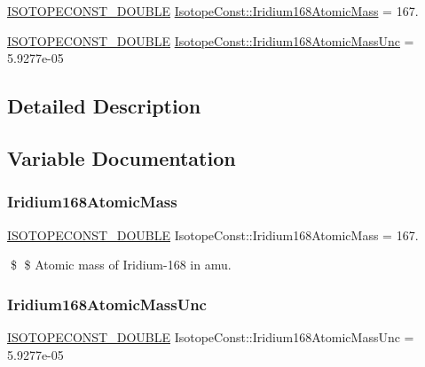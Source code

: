 \begin{DoxyCompactItemize}
\item 
\mbox{\hyperlink{group___isotope_const-_macros_ga8f45a7272ce02c0b4c65c44636ed719a}{I\+S\+O\+T\+O\+P\+E\+C\+O\+N\+S\+T\+\_\+\+D\+O\+U\+B\+LE}} \mbox{\hyperlink{group___isotope_const-_iridium-_ir168_gaa4c59a5023aafee19a18a7afe0813a67}{Isotope\+Const\+::\+Iridium168\+Atomic\+Mass}} = 167.
\item 
\mbox{\hyperlink{group___isotope_const-_macros_ga8f45a7272ce02c0b4c65c44636ed719a}{I\+S\+O\+T\+O\+P\+E\+C\+O\+N\+S\+T\+\_\+\+D\+O\+U\+B\+LE}} \mbox{\hyperlink{group___isotope_const-_iridium-_ir168_ga5d48b53f1c14d45e33f9a72706265089}{Isotope\+Const\+::\+Iridium168\+Atomic\+Mass\+Unc}} = 5.\+9277e-\/05
\end{DoxyCompactItemize}


\subsection{Detailed Description}


\subsection{Variable Documentation}
\mbox{\label{group___isotope_const-_iridium-_ir168_gaa4c59a5023aafee19a18a7afe0813a67}} 
\subsubsection{\texorpdfstring{Iridium168\+Atomic\+Mass}{Iridium168AtomicMass}}
{\footnotesize\ttfamily \mbox{\hyperlink{group___isotope_const-_macros_ga8f45a7272ce02c0b4c65c44636ed719a}{I\+S\+O\+T\+O\+P\+E\+C\+O\+N\+S\+T\+\_\+\+D\+O\+U\+B\+LE}} Isotope\+Const\+::\+Iridium168\+Atomic\+Mass = 167.}

\$ \$ Atomic mass of Iridium-\/168 in amu. \mbox{\label{group___isotope_const-_iridium-_ir168_ga5d48b53f1c14d45e33f9a72706265089}} 
\subsubsection{\texorpdfstring{Iridium168\+Atomic\+Mass\+Unc}{Iridium168AtomicMassUnc}}
{\footnotesize\ttfamily \mbox{\hyperlink{group___isotope_const-_macros_ga8f45a7272ce02c0b4c65c44636ed719a}{I\+S\+O\+T\+O\+P\+E\+C\+O\+N\+S\+T\+\_\+\+D\+O\+U\+B\+LE}} Isotope\+Const\+::\+Iridium168\+Atomic\+Mass\+Unc = 5.\+9277e-\/05}

